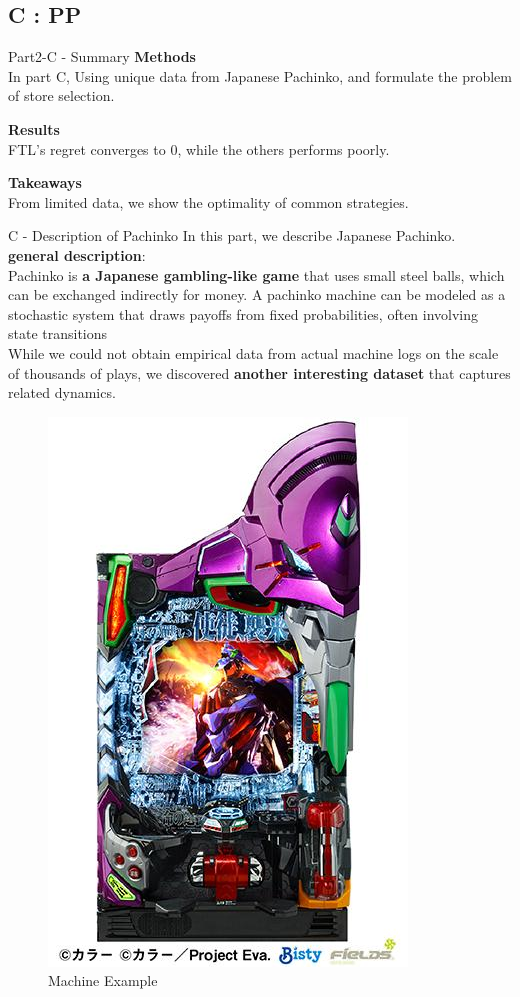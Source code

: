 \documentclass{beamer}
\begin{document}
\subsection{C : PP}

\begin{frame}{Part2-C - Summary}
\textbf{Methods}\\
In part C, Using unique data from Japanese Pachinko, and formulate the problem of store selection.  

\vspace{1em}
\textbf{Results}\\
FTL's regret converges to 0, while the others performs poorly.

\vspace{1em}
\textbf{Takeaways}\\
From limited data, we show the optimality of common strategies.
\end{frame}

\begin{frame}{C - Description of Pachinko}
    In this part, we describe Japanese Pachinko.\\
    {\small
    \textbf{general description}:\\
    Pachinko is \textbf{a Japanese gambling-like game} that uses small steel balls, which can be exchanged indirectly for money. A pachinko machine can be modeled as a stochastic system that draws payoffs from fixed probabilities, often involving state transitions\\
    \vspace{1em}
    While we could not obtain empirical data from actual machine logs on the scale of thousands of plays, we discovered \textbf{another interesting dataset} that captures related dynamics.}
    \begin{figure}
        \centering
        \includegraphics[width=0.15\linewidth]{332Project2//figures/machine_evangelion.jpg}
        \caption{Machine Example}
        \label{fig:placeholder}
    \end{figure}
\end{frame}
\end{document}
